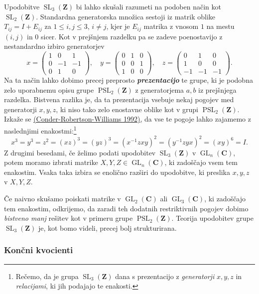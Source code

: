 \documentclass[11pt]{book}
\def\ZZ{\mathbf{Z}}
\def\CC{\mathbf{C}}
\DeclareMathOperator\GL{GL}
\DeclareMathOperator\SL{SL}
\DeclareMathOperator\PSL{PSL}
\def\definicija{\color{rdeca}\bf\em}
\theoremstyle{definition}
\theoremstyle{zgled}
\theoremstyle{odprtproblem}
\theoremstyle{domacanaloga}
\theoremstyle{izrek}
\begin{document}
Upodobitve $\SL_3(\ZZ)$ bi lahko skušali razumeti na podoben način kot $\SL_2(\ZZ)$. Standardna generatorska množica sestoji iz matrik oblike $T_{ij} = I + E_{ij}$ za $1 \leq i, j \leq 3$, $i \neq j$, kjer je $E_{ij}$ matrika z vnosom $1$ na mestu $(i,j)$ in $0$ sicer. Kot v prejšnjem razdelku pa se zadeve poenostavijo z nestandardno izbiro generatorjev
\[
    x =
    \begin{pmatrix}
        1 &  0 &  1 \\
        0 & -1 & -1 \\
        0 &  1 &  0
    \end{pmatrix}, \quad
    y =
    \begin{pmatrix}
        0 &  1 &  0 \\
        0 &  0 &  1 \\
        1 &  0 &  0
    \end{pmatrix}, \quad
    z =
    \begin{pmatrix}
        0 &  1 &  0 \\
        1 &  0 &  0 \\
       -1 & -1 & -1
    \end{pmatrix}.  
\]
Na ta način lahko dobimo precej preprosto {\definicija prezentacijo} te grupe, ki je podobna zelo uporabnemu opisu grupe $\PSL_2(\ZZ)$ z generatorjema $a,b$ iz prejšnjega razdelka. Bistvena razlika je, da ta prezentacija vsebuje nekaj pogojev med generatorji $x,y,z$, ki niso tako zelo enostavne oblike kot v grupi $\PSL_2(\ZZ)$. Izkaže se \href{https://www.ams.org/proc/1992-115-01/S0002-9939-1992-1079696-5/}{(Conder-Robertson-Williams 1992)}, da vse te pogoje lahko zajamemo z naslednjimi enakostmi:\footnote{Rečemo, da je grupa $\SL_3(\ZZ)$ dana s prezentacijo z \emph{generatorji} $x,y,z$ in \emph{relacijami}, ki jih podajajo te enakosti.}
\[
    x^3 = y^3 = z^2 = (xz)^3 = (yz)^3 = (x^{-1}zxy)^2 = (y^{-1}zyx)^2 = (xy)^6 = I.
\]
Z drugimi besedami, če želimo podati upodobitev $\SL_3(\ZZ)$ v $\GL_n(\CC)$, potem moramo izbrati matrike $X,Y,Z \in \GL_n(\CC)$, ki zadoščajo vsem tem enakostim. Vsaka taka izbira se enolično razširi do upodobitve, ki preslika $x,y,z$ v $X,Y,Z$.

Če naivno skušamo poiskati matrike v $\GL_2(\CC)$ ali $\GL_3(\CC)$, ki zadoščajo tem enakostim, odkrijemo, da zaradi teh dodatnih restriktivnih pogojev dobimo \emph{bistveno manj} rešitev kot v primeru grupe $\PSL_2(\ZZ)$. Teorija upodobitev grupe $\SL_3(\ZZ)$ je, kot bomo videli, precej bolj strukturirana.

\subsubsection{Končni kvocienti}
\end{document}
